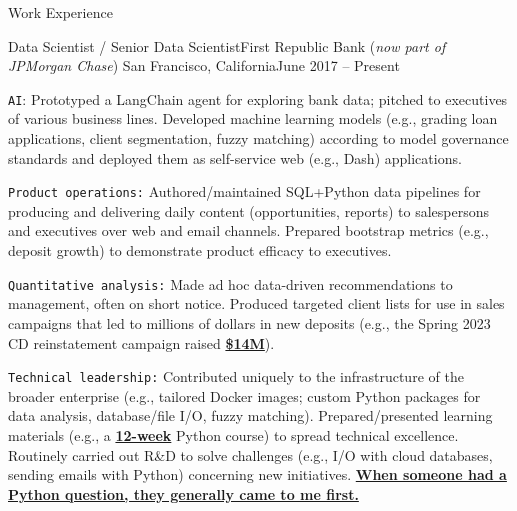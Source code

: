 \documentclass{article}
\newlength{\tabin}
\newlength{\secsep}
\newcommand{\lineunder}{\vspace*{-8pt} \\ \hspace*{-6pt} \hrulefill \\ \vspace*{-15pt}}
\newenvironment{tabbedsection}[1]{
  \begin{list}{}{
      \setlength{\itemsep}{0pt}
      \setlength{\labelsep}{0pt}
      \setlength{\labelwidth}{0pt}
      \setlength{\leftmargin}{\tabin}
      \setlength{\rightmargin}{\tabin}
      \setlength{\listparindent}{0pt}
      \setlength{\parsep}{0pt}
      \setlength{\parskip}{0pt}
      \setlength{\partopsep}{0pt}
      \setlength{\topsep}{#1}
    }
  \item[]
}{\end{list}}
\newenvironment{resume_section}[1]{
  \filbreak
  \vspace{2\secsep}
  \textsc{\large#1}
  \lineunder
  \begin{tabbedsection}{\secsep}
}{\end{tabbedsection}}
\newenvironment{subitems}{
  \renewcommand{\labelitemi}{-}
  \begin{itemize}
      \setlength{\labelsep}{1em}
}{\end{itemize}}
\newenvironment{resume_employer}[4]{
  \vspace{\secsep}
  \textbf{#1} \\ 
  \indent {\small #2} \hfill {\footnotesize#3 (#4)}
  \begin{tabbedsection}{0pt}
  \begin{subitems}
}{\end{subitems}\end{tabbedsection}}
\begin{document}
\begin{resume_section}{Work Experience}

  \begin{resume_employer}{Data Scientist / Senior Data Scientist}{First Republic Bank (\textit{now part of JPMorgan Chase})}
  {San Francisco, California}{June 2017 -- Present}

    \item \texttt{AI}: Prototyped a LangChain agent for exploring bank data; pitched to executives of various business lines. Developed machine learning models (e.g., grading loan applications, client segmentation, fuzzy matching) according to model governance standards and deployed them as self-service web (e.g., Dash) applications.
    \item \texttt{Product operations:} Authored/maintained SQL+Python data pipelines for producing and delivering daily content (opportunities, reports) to salespersons and executives over web and email channels. Prepared bootstrap metrics (e.g., deposit growth) to demonstrate product efficacy to executives.
    \item \texttt{Quantitative analysis:} Made ad hoc data-driven recommendations to management, often on short notice. Produced targeted client lists for use in sales campaigns that led to millions of dollars in new deposits (e.g., the Spring 2023 CD reinstatement campaign raised \underline{\textbf{\$14M}}).
    \item \texttt{Technical leadership:} Contributed uniquely to the infrastructure of the broader enterprise (e.g., tailored Docker images; custom Python packages for data analysis, database/file I/O, fuzzy matching). Prepared/presented learning materials (e.g., a \underline{\textbf{12-week}} Python course) to spread technical excellence. Routinely carried out R\&D to solve challenges (e.g., I/O with cloud databases, sending emails with Python) concerning new initiatives. \underline{\textbf{When someone had a Python question, they generally came to me first.}}
  \end{resume_employer}


\end{resume_section}
\end{document}
